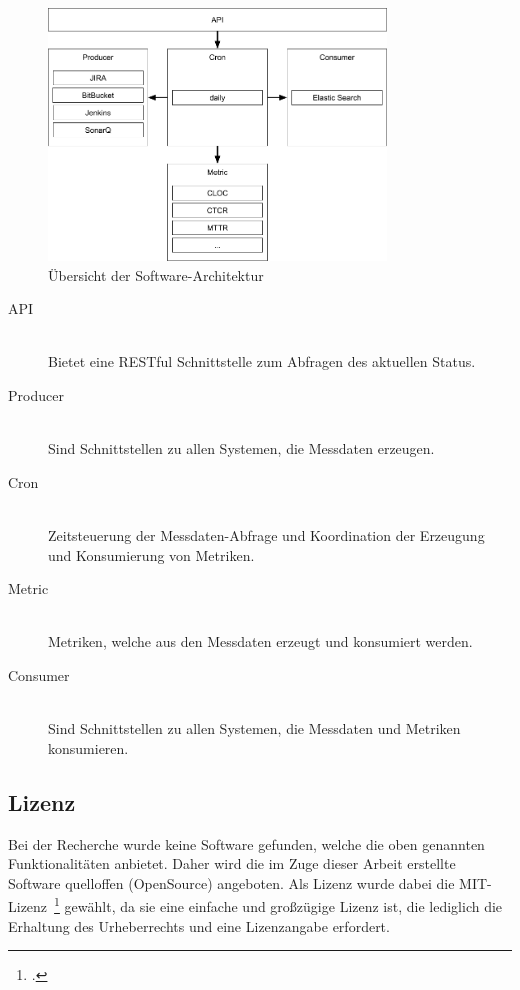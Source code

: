 \begin{savenotes}
    \begin{figure}[H] 
        \centering
            \includegraphics[width=0.8\textwidth]{img/architecture-overview.png}
        \caption{Übersicht der Software-Architektur}\label{fig:overview_architecture}
    \end{figure}
\end{savenotes}

\begin{description}
    \item[API] \hfill \\ Bietet eine RESTful Schnittstelle zum Abfragen des aktuellen Status.
    \item[Producer] \hfill \\ Sind Schnittstellen zu allen Systemen, die Messdaten erzeugen.
    \item[Cron] \hfill \\ Zeitsteuerung der Messdaten-Abfrage und Koordination der Erzeugung und Konsumierung von Metriken.
    \item[Metric] \hfill \\ Metriken, welche aus den Messdaten erzeugt und konsumiert werden.
    \item[Consumer] \hfill \\ Sind Schnittstellen zu allen Systemen, die Messdaten und Metriken konsumieren.
\end{description}

\subsection{Lizenz}

Bei der Recherche wurde keine Software gefunden, welche die oben genannten Funktionalitäten anbietet.
Daher wird die im Zuge dieser Arbeit erstellte Software quelloffen (OpenSource) angeboten.
Als Lizenz wurde dabei die MIT-Lizenz~\footcite{mit_license} gewählt, da sie eine einfache und großzügige Lizenz ist, die lediglich die Erhaltung des Urheberrechts und eine Lizenzangabe erfordert.

